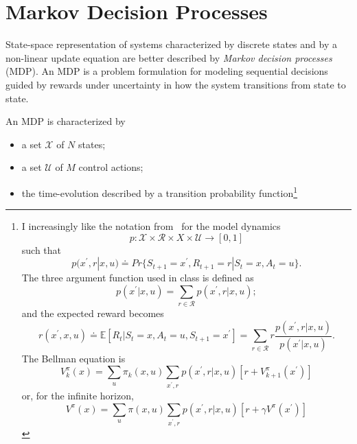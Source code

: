 \chapter{Markov Decision Processes}
\label{chap:markov-decision-processes}

State-space representation of systems characterized by discrete states and by a non-linear update equation are better described by \emph{Markov decision processes} (MDP). An MDP is a problem formulation for modeling sequential decisions guided by rewards under uncertainty in how the system transitions from state to state.

An MDP is characterized by
\begin{itemize}
\item a set $\mathcal{X}$ of $N$ states;
\item a set $\mathcal{U}$ of $M$ control actions;
\item the time-evolution described by a transition probability function\footnote{I increasingly like the notation from~\cite[Sect.~3.1]{reinforcement-learning-sutton-barto} for the model dynamics
    \begin{equation*}
      p:\mathcal{X}\times\mathcal{R}\times{X}\times\mathcal{U} \rightarrow [0,1]
    \end{equation*}
    such that
    \begin{equation*}
      p(x^\prime,r|x,u) \doteq Pr\{S_{t+1}=x^\prime,R_{t+1}=r|S_t=x,A_t=u\}.
    \end{equation*}
    The three argument function used in class is defined as
    \begin{equation*}
      p(x^\prime|x,u) = \sum_{r\in\mathcal{R}} p(x^\prime,r|x,u);
    \end{equation*}
    and the expected reward becomes
    \begin{equation*}
      r(x^\prime,x,u) \doteq \mathbb{E}[R_t|S_t=x,A_t=u,S_{t+1}=x^\prime] = \sum_{r\in\mathcal{R}} r \frac{p(x^\prime,r|x,u)}{p(x^\prime|x,u)}.
    \end{equation*}
    The Bellman equation is
    \begin{equation*}
      V_k^\pi(x) = \sum_u \pi_k(x,u) \sum_{x^\prime,r} p(x^\prime,r|x,u) \left[r+V_{k+1}^\pi(x^\prime)\right]
    \end{equation*}
    or, for the infinite horizon,
    \begin{equation*}
      V^\pi(x) = \sum_u \pi(x,u) \sum_{x^\prime,r} p(x^\prime,r|x,u) \left[r+\gamma V^\pi(x^\prime)\right]
    \end{equation*}
}
\end{itemize}
